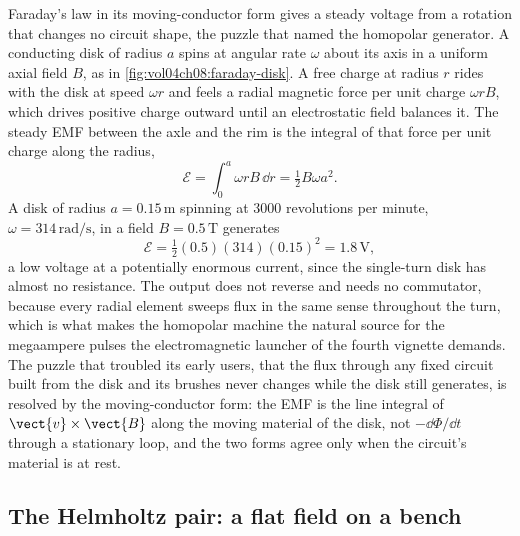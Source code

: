 Faraday's law in its moving-conductor form gives a steady voltage from a
rotation that changes no circuit shape, the puzzle that named the homopolar
generator. A conducting disk of radius $a$ spins at angular rate $\omega$
about its axis in a uniform axial field $B$, as in
\cref{fig:vol04ch08:faraday-disk}. A free charge at radius $r$ rides with the
disk at speed $\omega r$ and feels a radial magnetic force per unit charge
$\omega r B$, which drives positive charge outward until an electrostatic
field balances it. The steady EMF between the axle and the rim is the
integral of that force per unit charge along the radius,
\[
\mathcal{E} = \int_0^a \omega r B\,\dd r = \tfrac12 B\omega a^{2}.
\]
A disk of radius $a = 0.15\,\si{\meter}$ spinning at $3000$ revolutions per
minute, $\omega = 314\,\si{\radian\per\second}$, in a field $B = 0.5\,\si{
\tesla}$ generates
\[
\mathcal{E} = \tfrac12(0.5)(314)(0.15)^{2} = 1.8\,\si{\volt},
\]
a low voltage at a potentially enormous current, since the single-turn disk
has almost no resistance. The output does not reverse and needs no
commutator, because every radial element sweeps flux in the same sense
throughout the turn, which is what makes the homopolar machine the natural
source for the megaampere pulses the electromagnetic launcher of the fourth
vignette demands. The puzzle that troubled its early users, that the flux
through any fixed circuit built from the disk and its brushes never changes
while the disk still generates, is resolved by the moving-conductor form:
the EMF is the line integral of $\vect{v}\times\vect{B}$ along the moving
material of the disk, not $-\dd\Phi/\dd t$ through a stationary loop, and the
two forms agree only when the circuit's material is at rest.



\subsection{The Helmholtz pair: a flat field on a bench}

